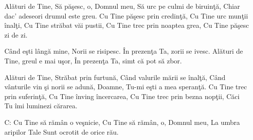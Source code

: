 
\beginverse
Alături de Tine,
Să păşesc, o, Domnul meu,
Să urc pe culmi de biruinţă,
Chiar dac’ adeseori drumul este greu.
Cu Tine păşesc prin credinţă,
Cu Tine urc munţii înalţi,
Cu Tine străbat văi pustii,
Cu Tine trec prin noaptea grea,
Cu Tine păşesc zi de zi.
\endverse

\beginchorus
Când eşti lângă mine,
Norii se risipesc.
În prezenţa Ta, zorii se ivesc.
Alături de Tine, greul e mai uşor,
În prezenţa Ta, simt că pot să zbor.
\endchorus

\beginverse
Alături de Tine,
Străbat prin furtună,
Când valurile mării se înalţă,
Când vânturile vin şi norii se adună,
Doamne, Tu-mi eşti a mea speranţă.
Cu Tine trec prin suferinţă,
Cu Tine înving încercarea,
Cu Tine trec prin bezna nopţii,
Căci Tu îmi luminezi cărarea.
\endverse

\beginverse*
C: Cu Tine să rămân o veşnicie,
Cu Tine să rămân, o, Domnul meu,
La umbra aripilor Tale
Sunt ocrotit de orice rău.
\endverse*

\endsong